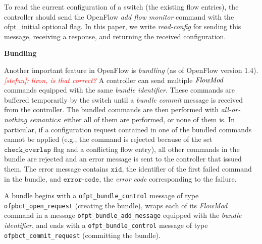 \documentclass[conference]{sigcomm-alternate}
\newcommand{\hide}[1]{}
\newcommand{\FlowMod}{\emph{FlowMod}\xspace}
\newcommand{\checko}{\texttt{check\_overlap}\xspace}
\newcommand{\stefan}[1]{\textit{\textcolor{red}{[stefan]: #1}}} %
\newcommand{\xid}{\texttt{xid}}
\newcommand{\ecode}{\texttt{error-code}}
\begin{document}
To read the current configuration of a switch (the existing flow entries), the controller should send
the OpenFlow \emph{add flow monitor} command with the \textsf{ofpt\_initial} optional flag.
In this paper, we write \textit{read-config} for sending
this message, receiving a response, and returning the received configuration.

\hide{
We also remark that our solution is only based on flow tables
and does not make use
of \emph{OpenFlow group tables}, nor do we make use of \emph{cookies}: rules
are always identified by exact matches.
}

\noindent\textbf{Bundling}

Another important feature in OpenFlow is \emph{bundling} (as of OpenFlow version 1.4). \stefan{liron, is that correct?}
A controller can send multiple $\FlowMod$ commands  equipped with
the same \emph{bundle identifier}.
These commands are buffered temporarily by
the switch until a \emph{bundle commit} message is received from the
controller.
The bundled commands are then performed with \emph{all-or-nothing semantics}:
either all of them are performed, or none of them is.
In particular, if a configuration request contained in one of the bundled commands cannot
be applied (e.g., the command is rejected because of the set
$\checko$ flag and a conflicting flow entry), all  other commands in
the bundle are rejected and an error
message is sent to the controller that issued them.
The error message contains $\xid$, the identifier of the first failed command in the
bundle, and $\ecode$, the \emph{error code} corresponding to the failure.

A bundle begins with a  \texttt{ofpt\_bundle\_control} message of type
\texttt{ofpbct\_open\_request} (creating the bundle), wraps
each of its \emph{FlowMod} command in a message
\texttt{ofpt\_bundle\_add\_message} equipped with the \emph{bundle
  identifier}, and ends with a \texttt{ofpt\_bundle\_control} message of
type \texttt{ofpbct\_commit\_request} (committing the bundle).

\end{document}
